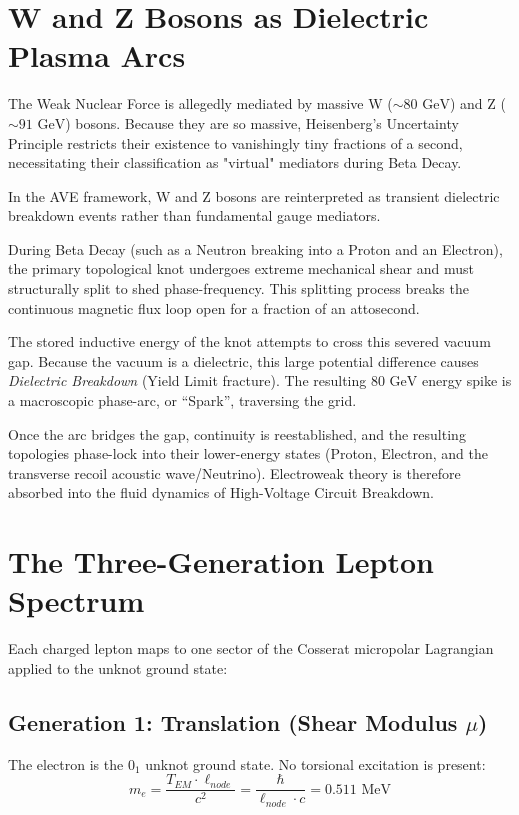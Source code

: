 \section{W and Z Bosons as Dielectric Plasma Arcs}
The Weak Nuclear Force is allegedly mediated by massive W ($\sim 80 \text{ GeV}$) and Z ($\sim 91 \text{ GeV}$) bosons. Because they are so massive, Heisenberg's Uncertainty Principle restricts their existence to vanishingly tiny fractions of a second, necessitating their classification as "virtual" mediators during Beta Decay.

In the AVE framework, W and Z bosons are reinterpreted as transient dielectric breakdown events rather than fundamental gauge mediators.

During Beta Decay (such as a Neutron breaking into a Proton and an Electron), the primary topological knot undergoes extreme mechanical shear and must structurally split to shed phase-frequency. This splitting process breaks the continuous magnetic flux loop open for a fraction of an attosecond. 

The stored inductive energy of the knot attempts to cross this severed vacuum gap. Because the vacuum is a dielectric, this large potential difference causes \textit{Dielectric Breakdown} (Yield Limit fracture). The resulting $80 \text{ GeV}$ energy spike is a macroscopic phase-arc, or ``Spark'', traversing the grid. 

Once the arc bridges the gap, continuity is reestablished, and the resulting topologies phase-lock into their lower-energy states (Proton, Electron, and the transverse recoil acoustic wave/Neutrino). Electroweak theory is therefore absorbed into the fluid dynamics of High-Voltage Circuit Breakdown.

\section{The Three-Generation Lepton Spectrum}

Each charged lepton maps to one sector of the Cosserat micropolar Lagrangian applied to the unknot ground state:

\subsection{Generation 1: Translation (Shear Modulus $\mu$)}

The electron is the $0_1$ unknot ground state. No torsional excitation is present:
\begin{equation}
    m_e = \frac{T_{EM} \cdot \ell_{node}}{c^2} = \frac{\hbar}{\ell_{node} \cdot c} = 0.511 \text{ MeV}
\end{equation}

